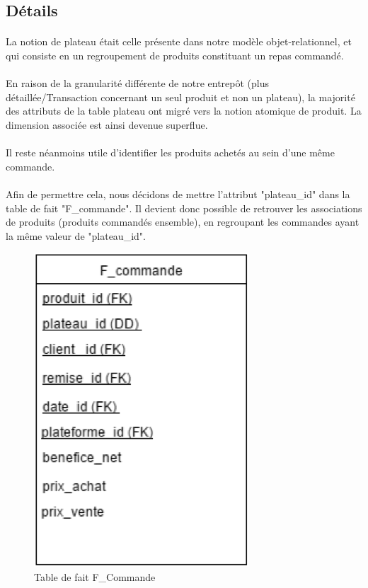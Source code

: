 \subsection{Détails}

\paragraph{} La notion de plateau était celle présente dans notre modèle objet-relationnel, et qui consiste en un regroupement de produits constituant un repas commandé.
\paragraph{} En raison de la granularité différente de notre entrepôt (plus détaillée/Transaction concernant un seul produit et non un plateau), la majorité des attributs de la table plateau ont migré vers la notion atomique de produit. La dimension associée est ainsi devenue superflue.
\paragraph{} Il reste néanmoins utile d’identifier les produits achetés au sein d’une même commande. 
\paragraph{} Afin de permettre cela, nous décidons de mettre l’attribut  "plateau\_id" dans la table de fait "F\_commande". Il devient donc possible de retrouver les associations de produits (produits commandés ensemble), en regroupant les commandes ayant la même valeur de "plateau\_id".

    \begin{figure}[h]
        \centerline{\includegraphics[scale=0.6]{TableFCom}}
        \caption{Table de fait F\_Commande}
        \label{fig:UML}
    \end{figure}
